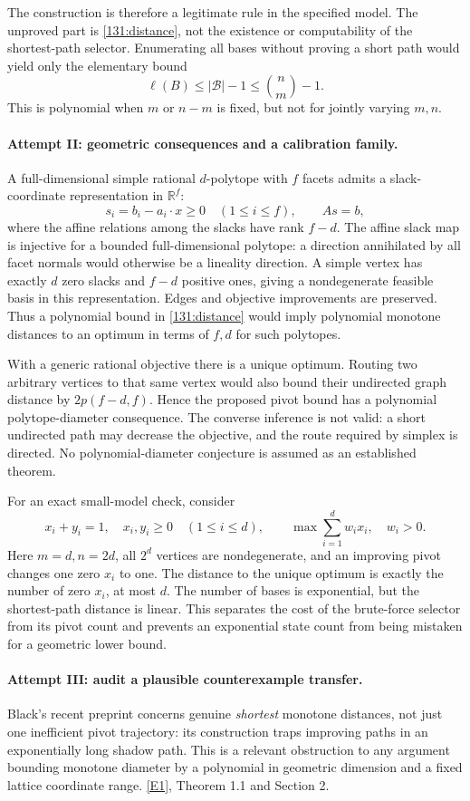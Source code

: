 \documentclass[11pt,a4paper]{article}
\newcommand{\R}{\mathbb{R}}
\newcommand{\eref}[2]{\hyperlink{extra:#1:#2}{[E#2]}}
\numberwithin{equation}{section}
\begin{document}
The construction is therefore a legitimate rule in the specified
model.  The unproved part is \eqref{131:distance}, not the existence
or computability of the shortest-path selector.  Enumerating all bases
without proving a short path would yield only the elementary bound
\[
 \ell(B)\leq|\mathcal B|-1\leq\binom nm-1.
\]
This is polynomial when $m$ or $n-m$ is fixed, but not for jointly
varying $m,n$.

\paragraph{Attempt II: geometric consequences and a calibration family.}
A full-dimensional simple rational $d$-polytope with $f$ facets admits
a slack-coordinate representation in $\R^f$:
\[
 s_i=b_i-a_i\cdot x\geq0\quad(1\leq i\leq f),\qquad As=b,
\]
where the affine relations among the slacks have rank $f-d$.
The affine slack map is injective for a bounded full-dimensional
polytope: a direction annihilated by all facet normals would otherwise
be a lineality direction.  A simple vertex has exactly $d$ zero slacks
and $f-d$ positive ones, giving a nondegenerate feasible basis in this
representation.  Edges and objective improvements are preserved.
Thus a polynomial bound in \eqref{131:distance} would imply polynomial
monotone distances to an optimum in terms of $f,d$ for such polytopes.

With a generic rational objective there is a unique optimum.  Routing
two arbitrary vertices to that same vertex would also bound their
undirected graph distance by $2p(f-d,f)$.  Hence the proposed pivot
bound has a polynomial polytope-diameter consequence.  The converse
inference is not valid: a short undirected path may decrease the
objective, and the route required by simplex is directed.  No
polynomial-diameter conjecture is assumed as an established theorem.

For an exact small-model check, consider
\[
 x_i+y_i=1,\quad x_i,y_i\geq0\quad(1\leq i\leq d),\qquad
 \max\sum_{i=1}^d w_i x_i,\quad w_i>0.
\]
Here $m=d,n=2d$, all $2^d$ vertices are nondegenerate, and an improving
pivot changes one zero $x_i$ to one.  The distance to the unique
optimum is exactly the number of zero $x_i$, at most $d$.  The number
of bases is exponential, but the shortest-path distance is linear.
This separates the cost of the brute-force selector from its pivot
count and prevents an exponential state count from being mistaken
for a geometric lower bound.

\paragraph{Attempt III: audit a plausible counterexample transfer.}
Black's recent preprint concerns genuine \emph{shortest} monotone
distances, not just one inefficient pivot trajectory: its construction
traps improving paths in an exponentially long shadow path.  This is
a relevant obstruction to any argument bounding monotone diameter by
a polynomial in geometric dimension and a fixed lattice coordinate
range. \eref{131}{1}, Theorem 1.1 and Section 2.
\end{document}

